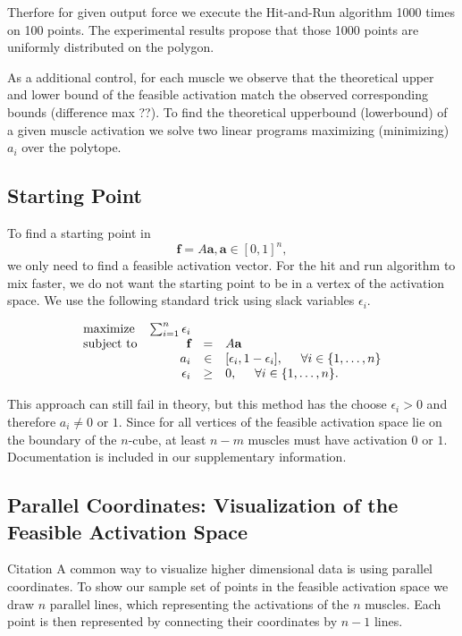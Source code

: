 Therfore for given output force we execute the Hit-and-Run algorithm 1000 times on 100 points. The experimental results propose that those 1000 points are uniformly distributed on the polygon.

As a additional control, for each muscle we observe that the theoretical upper and lower bound of the feasible activation match the observed corresponding bounds (difference max ??). To find the theoretical upperbound (lowerbound) of a given muscle activation we solve two linear programs maximizing (minimizing)  $a_i$ over the polytope.



\subsection{Starting Point}
To find a starting point in 
\[\textbf{f} = A\textbf{a}, \textbf{a} \in [0,1]^n,\]
we only need to find a feasible activation vector. For the hit and run algorithm to mix faster, we do not want the starting point to be in a vertex of the activation space. We use the following standard trick using slack variables $\epsilon_i$.

\begin{equation}\label{eq:LP_r}
\begin{array}{lrcl}
\mbox{maximize} & \sum_{i=1}^n \epsilon_i \\ 
\mbox{subject to} & \textbf{f} &=& A\textbf{a}\\
  & a_i &\in& [\epsilon_i, 1- \epsilon_i], \hspace{5mm} \forall i \in \{1,\dots,n\}  \\
  & \epsilon_i &\geq& 0, \hspace{5mm} \forall i \in \{1,\dots,n\}.  
\end{array}
\end{equation}

This approach can still fail in theory, but this method has the choose $\epsilon_i > 0$ and therefore $a_i \neq 0$ or $1$. Since for all vertices of the feasible activation space lie on the boundary of the $n$-cube, at least $n-m$ muscles must have activation $0$ or $1$. Documentation is included in our supplementary information.

\subsection{Parallel Coordinates: Visualization of the Feasible Activation Space}
Citation
A common way to visualize higher dimensional data is using parallel coordinates. To show our sample set of points in the feasible activation space we draw $n$ parallel lines, which representing the activations of the $n$ muscles. Each point is then represented by connecting their coordinates by $n-1$ lines.


